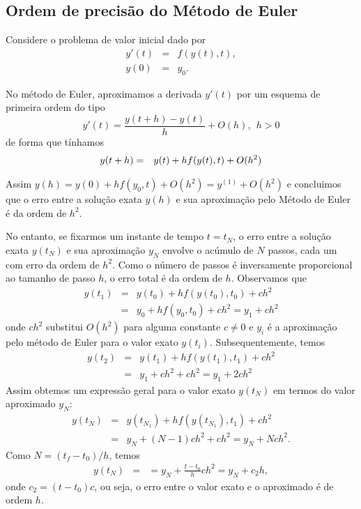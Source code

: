 \subsection{Ordem de precisão do Método de Euler}
Considere o problema de valor inicial dado por
\begin{eqnarray*}
y'(t)&=&f(y(t),t),\\
y(0)&=&y_0.
\end{eqnarray*}

No método de Euler, aproximamos a derivada $y'(t)$ por um esquema de primeira ordem do tipo
$$y'(t)=\frac{y(t+h)-y(t)}{h}+O(h),~~ h>0$$
de forma que tínhamos
\begin{eqnarray}{\label{es_Euler}}
y(t+h)&=&y(t)+hf(y(t),t)+O(h^2)
\end{eqnarray}

Assim $y(h)=y(0)+hf(y_0,t)+O(h^2)= y^{(1)}+O(h^2)$ e concluimos que o erro entre a solução exata $y(h)$ e sua aproximação pelo Método de Euler é da ordem de $h^2$. 

No entanto, se fixarmos um instante de tempo $t=t_N$, o erro entre a solução exata $y(t_N)$ e sua aproximação $y_N$ envolve o acúmulo de $N$ passos, cada um com erro da ordem de $h^2$. Como o número de passos é inversamente proporcional ao tamanho de passo $h$, o erro total é da ordem de $h$. Observamos que
\begin{eqnarray*}
 y(t_1)&=&y(t_0)+hf(y(t_0),t_0)+ch^2\\
 &=&y_0+hf(y_0,t_0)+ch^2=y_1+ch^2
\end{eqnarray*}
onde $ch^2$ substitui $O(h^2)$ para alguma constante $c\neq 0$ e $y_i$ é a aproximação pelo método de Euler para o valor exato $y(t_i)$. Subsequentemente, temos
\begin{eqnarray*}
 y(t_2)&=&y(t_1)+hf(y(t_1),t_1)+ch^2\\
 &=&y_1+ch^2+ch^2=y_1+2ch^2
\end{eqnarray*}
Assim obtemos um expressão geral para o valor exato $y(t_N)$ em termos do valor aproximado $y_N$:
\begin{eqnarray*}
 y(t_N)&=&y(t_{N_1})+hf(y(t_{N_1}),t_1)+ch^2\\
 &=&y_{N}+(N-1)ch^2+ch^2=y_N+Nch^2.
\end{eqnarray*}
Como $N=(t_f-t_0)/h$, temos
\begin{eqnarray*}
 y(t_N)&=&=y_{N}+\frac{t-t_0}{h}ch^2=y_{N}+c_2h,
\end{eqnarray*}
onde $c_2=(t-t_0)c$, ou seja, o erro entre o valor exato e o aproximado é de ordem $h$.

